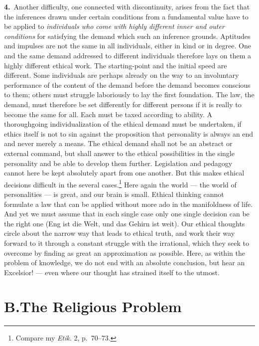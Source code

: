 \documentclass[12pt,a4paper]{book}
\newcommand{\opage}[1]{\marginnote{\footnotesize\textit{[#1]}}}
\begin{document}
\noindent\textbf{4.}~Another difficulty, one connected with discontinuity, arises
from the fact that the inferences drawn under certain conditions from a
fundamental value have to be applied to \emph{individuals \opage{78}who come with highly
different inner and outer conditions} for satisfying the demand which such an
inference grounds. Aptitudes and impulses are not the same in all individuals,
either in kind or in degree. One and the same demand addressed to different
individuals therefore lays on them a highly different ethical work. The
starting-point and the initial speed are different. Some individuals are perhaps
already on the way to an involuntary performance of the content of the demand
before the demand becomes conscious to them; others must struggle laboriously to
lay the first foundation. The law, the demand, must therefore be set differently
for different persons if it is really to become the same for all. Each must be
taxed according to ability. A thoroughgoing individualization of the ethical
demand must be undertaken, if ethics itself is not to sin against the proposition
that personality is always an end and never merely a means. The ethical demand
shall not be an abstract or external command, but shall answer to the ethical
possibilities in the single personality and be able to develop them further.
Legislation and pedagogy cannot here be kept absolutely apart from one another.
But this makes ethical decisions difficult in the several cases.\footnote{Compare
my \textit{Etik}. 2, p.~70--73.} Here again the world --- the world of
personalities --- is great, and our brain is small. Ethical thinking cannot
formulate a law that can be applied without more ado in the manifoldness of life.
And yet we must assume that in each single case only one single decision can be
the right one (Eng ist die Welt, und das Gehirn ist weit). Our ethical thoughts
circle about the narrow way that leads to ethical truth, and work their way
forward to it through a constant struggle with the irrational, which they seek to
overcome by finding as great an approximation as possible. Here, as within the
problem of knowledge, we do not end with an absolute conclusion, but hear an
Excelsior! --- even where our thought has strained itself to the utmost.

\section*{B.\quad The Religious Problem}
\label{sec:religiose}
\end{document}
